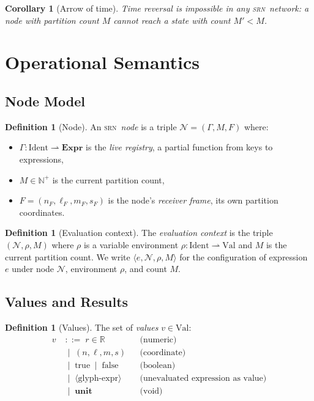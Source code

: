 \documentclass[twocolumn,11pt,a4paper]{article}
\newtheorem{corollary}[theorem]{Corollary}
\theoremstyle{definition}
\newtheorem{definition}[theorem]{Definition}
\theoremstyle{remark}
\newcommand{\srn}{\textsc{srn}}
\newcommand{\Node}{\mathcal{N}}
\newcommand{\Reg}{\Gamma}
\newcommand{\Expr}{\mathbf{Expr}}
\newcommand{\bnfeq}{\;{::=}\;}
\newcommand{\bnfor}{\;\mid\;}
\begin{document}
\begin{corollary}[Arrow of time]
\label{cor:time}
Time reversal is impossible in any \srn\ network: a node with partition
count $M$ cannot reach a state with count $M' < M$.
\end{corollary}

\section{Operational Semantics}
\label{sec:semantics}

\subsection{Node Model}

\begin{definition}[Node]
\label{def:node}
An \srn\ \emph{node} is a triple $\Node = (\Reg, M, F)$ where:
\begin{itemize}[noitemsep,topsep=2pt]
\item $\Reg : \mathrm{Ident} \rightharpoonup \Expr$ is the \emph{live
  registry}, a partial function from keys to expressions,
\item $M \in \mathbb{N}^+$ is the current partition count,
\item $F = (n_F, \ell_F, m_F, s_F)$ is the node's \emph{receiver
  frame}, its own partition coordinates.
\end{itemize}
\end{definition}

\begin{definition}[Evaluation context]
The \emph{evaluation context} is the triple $(\Node, \rho, M)$ where
$\rho$ is a variable environment $\rho : \mathrm{Ident} \rightharpoonup
\mathrm{Val}$ and $M$ is the current partition count.  We write
$\langle e, \Node, \rho, M \rangle$ for the configuration of expression
$e$ under node $\Node$, environment $\rho$, and count $M$.
\end{definition}

\subsection{Values and Results}

\begin{definition}[Values]
The set of \emph{values} $v \in \mathrm{Val}$:
\begin{align*}
v &\bnfeq r \in \mathbb{R} && \text{(numeric)}\\
  &\bnfor (n,\ell,m,s) && \text{(coordinate)}\\
  &\bnfor \mathrm{true} \bnfor \mathrm{false} && \text{(boolean)}\\
  &\bnfor \langle\text{glyph-expr}\rangle && \text{(unevaluated expression as value)}\\
  &\bnfor \mathbf{unit} && \text{(void)}
\end{align*}
\end{definition}
\end{document}
